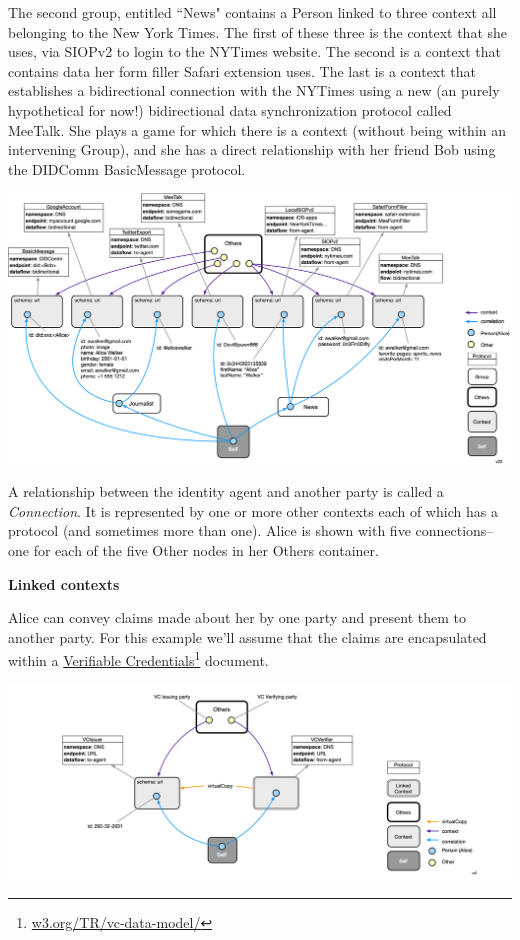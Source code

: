 \documentclass[11pt, oneside]{article}   	%
\newcommand{\hyperfootnote}[1][]{\def\ArgI{{#1}}\hyperfootnoteRelay}
\newcommand\hyperfootnoteRelay[2][]{\href{#1#2}{\ArgI}\footnote{\href{#1#2}{#2}}}
\begin{document}
The second group, entitled ``News" contains a Person linked to three context all belonging to the New York Times. The first of these three is the context that she uses, via SIOPv2 to login to the NYTimes website. The second is a context that contains data her form filler Safari extension uses. The last is a context that establishes a bidirectional connection with the NYTimes using a new (an purely hypothetical for now!) bidirectional data synchronization protocol called MeeTalk. She plays a game for which there is a context (without being within an intervening Group), and she has a direct relationship with her friend Bob using the DIDComm BasicMessage protocol.  

\includegraphics[width=\textwidth]{./images/multiple-connections.png}

A relationship between the identity agent and another party is called a \emph{Connection}. It is represented by one or more other contexts each of which has a protocol (and sometimes more than one). Alice is shown with five connections--one for each of the five Other nodes in her Others container. 

\textbf{Linked contexts}

Alice can convey claims made about her by one party and present them to another party. For this example we'll assume that the claims are encapsulated within a \hyperfootnote[Verifiable Credentials][https://]{w3.org/TR/vc-data-model/} document. 

\includegraphics[width=\textwidth]{./images/linked-contexts.png}
\end{document}
